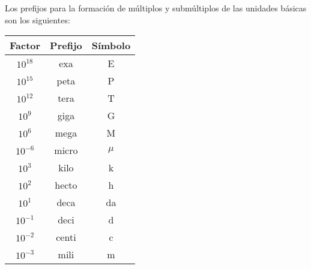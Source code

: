 Los prefijos para la formación de múltiplos y submúltiplos de las unidades básicas son los siguientes:
\begin{center}
    \begin{tabular}{c|c|c}
        Factor & Prefijo & Símbolo \\
        \hline
        $10^{18}$ & exa & E \\
        $10^{15}$ & peta & P \\
        $10^{12}$ & tera & T \\
        $10^{9}$ & giga & G \\
        $10^{6}$ & mega & M \\
        $10^{-6}$ & micro & $\mu$ \\
        \hline
        $10^{3}$ & kilo & k \\
        $10^{2}$ & hecto & h \\
        $10^{1}$ & deca & da \\
        $10^{-1}$ & deci & d \\
        $10^{-2}$ & centi & c \\
        $10^{-3}$ & mili & m \\
        \hline
    \end{tabular}
\end{center}

